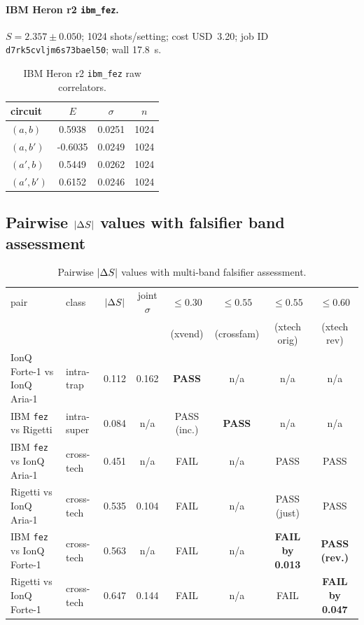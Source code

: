 \paragraph{IBM Heron r2 \texttt{ibm\_fez}.}
$S = 2.357 \pm 0.050$; 1024 shots/setting; cost USD~3.20; job ID
\texttt{d7rk5cvljm6s73bael50}; wall 17.8~s.

\begin{table}[htbp]
\centering
\caption{IBM Heron r2 \texttt{ibm\_fez} raw correlators.}
\label{tab:correlators_ibm}
\footnotesize
\begin{tabular}{l c c c}
\toprule
circuit & $E$ & $\sigma$ & $n$ \\
\midrule
$(a, b)$   &  0.5938 & 0.0251 & 1024 \\
$(a, b')$  & -0.6035 & 0.0249 & 1024 \\
$(a', b)$  &  0.5449 & 0.0262 & 1024 \\
$(a', b')$ &  0.6152 & 0.0246 & 1024 \\
\bottomrule
\end{tabular}
\end{table}

\subsection{Pairwise $\lvert\Delta S\rvert$ values with falsifier band assessment}

\begin{table}[htbp]
\centering
\caption{Pairwise $\lvert\Delta S\rvert$ values with multi-band falsifier assessment.}
\label{tab:pairwise_delta_falsifier_assessment}
\scriptsize
\begin{tabular}{l l c c c c c c}
\toprule
pair & class & $\lvert\Delta S\rvert$ & joint $\sigma$ & $\le 0.30$ & $\le 0.55$ & $\le 0.55$ & $\le 0.60$ \\
     &       &       &                & (xvend) & (crossfam) & (xtech orig) & (xtech rev) \\
\midrule
IonQ Forte-1 vs IonQ Aria-1   & intra-trap  & 0.112 & 0.162 & \textbf{PASS} & n/a   & n/a   & n/a   \\
IBM \texttt{fez} vs Rigetti   & intra-super & 0.084 & n/a   & PASS (inc.)   & \textbf{PASS} & n/a & n/a \\
IBM \texttt{fez} vs IonQ Aria-1 & cross-tech & 0.451 & n/a  & FAIL  & n/a   & PASS  & PASS  \\
Rigetti vs IonQ Aria-1        & cross-tech  & 0.535 & 0.104 & FAIL  & n/a   & PASS (just) & PASS \\
IBM \texttt{fez} vs IonQ Forte-1 & cross-tech & 0.563 & n/a   & FAIL  & n/a   & \textbf{FAIL by 0.013} & \textbf{PASS (rev.)} \\
Rigetti vs IonQ Forte-1       & cross-tech  & 0.647 & 0.144 & FAIL  & n/a   & FAIL  & \textbf{FAIL by 0.047} \\
\bottomrule
\end{tabular}
\end{table}

